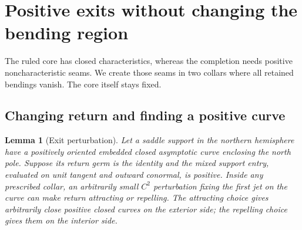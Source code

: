 \documentclass[11pt]{amsart}
\newtheorem{lemma}[theorem]{Lemma}
\theoremstyle{definition}
\theoremstyle{remark}
\numberwithin{equation}{section}
\begin{document}
\section{Positive exits without changing the bending region}\label{sec:exits}
The ruled core has closed characteristics, whereas the completion needs
positive noncharacteristic seams. We create those seams in two collars
where all retained bendings vanish. The core itself stays fixed.

\subsection{Changing return and finding a positive curve}
\begin{lemma}[Exit perturbation]\label{lem:exit}
Let a saddle support in the northern hemisphere have a positively oriented
embedded closed asymptotic curve enclosing the north pole. Suppose its
return germ is the identity and the mixed support entry, evaluated on
unit tangent and outward conormal, is positive. Inside any prescribed
collar, an arbitrarily small $C^2$ perturbation fixing the first jet on
the curve can make return attracting or repelling. The attracting choice
gives arbitrarily close positive closed curves on the exterior side;
the repelling choice gives them on the interior side.
\end{lemma}
\end{document}
